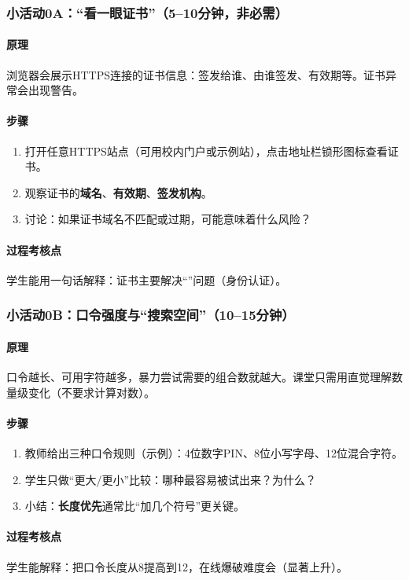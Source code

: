 \documentclass[UTF8,a4paper,12pt]{ctexart}
\begin{document}
\subsubsection*{小活动0A：``看一眼证书''（5--10分钟，非必需）}
\paragraph{原理}
浏览器会展示HTTPS连接的证书信息：签发给谁、由谁签发、有效期等。证书异常会出现警告。
\paragraph{步骤}
\begin{enumerate}
  \item 打开任意HTTPS站点（可用校内门户或示例站），点击地址栏锁形图标查看证书。
  \item 观察证书的\textbf{域名}、\textbf{有效期}、\textbf{签发机构}。
  \item 讨论：如果证书域名不匹配或过期，可能意味着什么风险？
\end{enumerate}
\paragraph{过程考核点}
学生能用一句话解释：证书主要解决``\underline{\hspace{6em}}''问题（身份认证）。

\subsubsection*{小活动0B：口令强度与``搜索空间''（10--15分钟）}
\paragraph{原理}
口令越长、可用字符越多，暴力尝试需要的组合数就越大。课堂只需用直觉理解数量级变化（不要求计算对数）。
\paragraph{步骤}
\begin{enumerate}
  \item 教师给出三种口令规则（示例）：4位数字PIN、8位小写字母、12位混合字符。
  \item 学生只做``更大/更小''比较：哪种最容易被试出来？为什么？
  \item 小结：\textbf{长度优先}通常比``加几个符号''更关键。
\end{enumerate}
\paragraph{过程考核点}
学生能解释：把口令长度从8提高到12，在线爆破难度会\underline{\hspace{6em}}（显著上升）。
\end{document}
